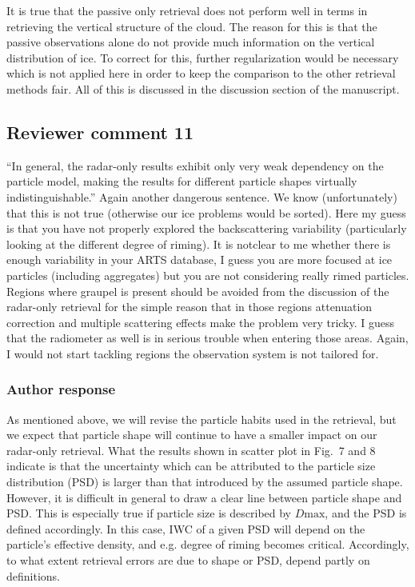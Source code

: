 \documentclass[11pt]{scrartcl}
\begin{document}
It is true that the passive only retrieval does not perform well in terms in
retrieving the vertical structure of the cloud. The reason for this is that the
passive observations alone do not provide much information on the vertical
distribution of ice. To correct for this, further regularization would be
necessary which is not applied here in order to keep the comparison to the
other retrieval methods fair. All of this is discussed in the discussion
section of the manuscript.

\subsection*{Reviewer comment 11}

“In general, the radar-only results exhibit only very weak dependency on the
particle model, making the results for different particle shapes virtually
indistinguishable.” Again another dangerous sentence. We know (unfortunately)
that this is not true (otherwise our ice problems would be sorted). Here my guess
is that you have not properly explored the backscattering variability
(particularly looking at the different degree of riming). It is notclear to me
whether there is enough variability in your ARTS database, I guess you are more
focused at ice particles (including aggregates) but you are not considering
really rimed particles. Regions where graupel is present should be avoided from
the discussion of the radar-only retrieval for the simple reason that in those
regions attenuation correction and multiple scattering effects make the problem
very tricky. I guess that the radiometer as well is in serious trouble when
entering those areas. Again, I would not start tackling regions the observation
system is not tailored for.

\subsubsection*{Author response}

As mentioned above, we will revise the particle habits used in the retrieval,
but we expect that particle shape will continue to have a smaller impact on our
radar-only retrieval. What the results shown in scatter plot in Fig.~7 and 8
indicate is that the uncertainty which can be attributed to the particle size
distribution (PSD) is larger than that introduced by the assumed particle shape.
However, it is difficult in general to draw a clear line between particle shape
and PSD. This is especially true if particle size is described by $D\text{max}$,
and the PSD is defined accordingly. In this case, IWC of a given PSD will depend
on the particle's effective density, and e.g. degree of riming becomes critical.
Accordingly, to what extent retrieval errors are due to shape or PSD, depend
partly on definitions.
\end{document}
